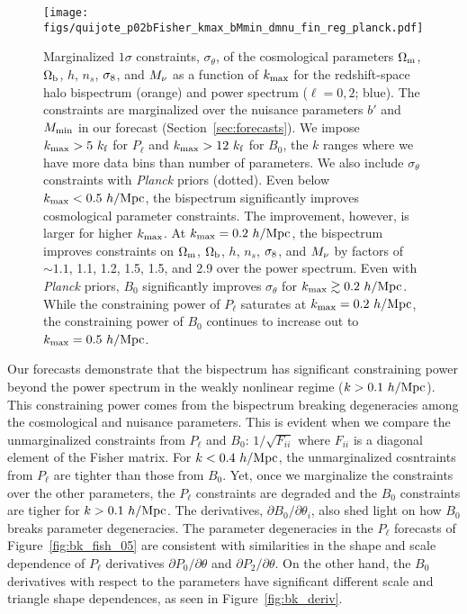 \begin{figure}
\begin{center}
    \texttt{[image: figs/quijote\_p02bFisher\_kmax\_bMmin\_dmnu\_fin\_reg\_planck.pdf]} 
    \caption{Marginalized $1\sigma$ constraints, $\sigma_\theta$, of the cosmological 
    parameters $\Omega_{\rm m}$, $\Omega_{\rm b}$, $h$, $n_s$, $\sigma_8$, and $M_\nu$ as a function 
    of $k_{\rm max}$ for the redshift-space halo bispectrum (orange) and power 
    spectrum ($\ell = 0, 2$; blue). The constraints are marginalized over the nuisance parameters 
    $b'$ and $M_{\rm min}$ in our forecast (Section~\ref{sec:forecasts}). We impose 
    $k_{\rm max} > 5~k_{\rm f}$ for $P_\ell$ and $k_{\rm max} > 12~k_{\rm f}$ 
    for $B_0$, the $k$ ranges where we have more data bins than number of parameters. 
    We also include $\sigma_\theta$ constraints with {\em Planck} priors (dotted). 
    Even below $k_{\rm max} < 0.5~h/{\rm Mpc}$, the bispectrum significantly 
    improves cosmological parameter constraints. The improvement, however, is larger 
    for higher $k_{\rm max}$. At $k_{\rm max} = 0.2~h/{\rm Mpc}$, the bispectrum 
    improves constraints on $\Omega_{\rm m}$, $\Omega_{\rm b}$, $h$, $n_s$, $\sigma_8$, and $M_\nu$ by factors 
    of $\sim 1.1$, 1.1, 1.2, 1.5, 1.5, and 2.9 over the power spectrum. Even with 
    {\em Planck} priors, $B_0$ significantly improves $\sigma_\theta$ for $k_{\rm max} \gtrsim 0.2~h/{\rm Mpc}$. 
    While the constraining power of $P_\ell$ saturates at $k_{\rm max} = 0.2~h/{\rm Mpc}$,
    the constraining power of $B_0$ continues to increase out to $k_{\rm max} = 0.5~h/{\rm Mpc}$.}
\label{fig:fish_kmax}
\end{center}
\end{figure}
Our forecasts demonstrate that the bispectrum has significant constraining power 
beyond the power spectrum in the weakly nonlinear regime ($k > 0.1~h/{\rm Mpc}$). 
This constraining power 
comes from the bispectrum breaking degeneracies among the cosmological and 
nuisance parameters. This is evident when we compare the unmarginalized 
constraints from $P_\ell$ and $B_0$: $1/\sqrt{F_{ii}}$ where $F_{ii}$ is a 
diagonal element of the Fisher matrix. For $k < 0.4~h/{\rm Mpc}$, the unmarginalized 
cosntraints from $P_\ell$ are tighter than those from $B_0$. Yet, once we 
marginalize the constraints over the other parameters, the $P_\ell$ constraints 
are degraded and the $B_0$ constraints are tigher for $k > 0.1~h/{\rm Mpc}$. The derivatives, 
$\partial B_0/\partial \theta_i$, also shed light on how $B_0$ breaks parameter 
degeneracies. The parameter degeneracies in the $P_\ell$ forecasts of Figure~\ref{fig:bk_fish_05} 
are consistent with similarities in the shape and scale dependence of 
$P_\ell$ derivatives $\partial P_0/\partial \theta$ and $\partial P_2/\partial \theta$. 
On the other hand, the $B_0$ derivatives with respect to the parameters 
have significant different scale and triangle shape dependences, as seen 
in Figure~\ref{fig:bk_deriv}.

